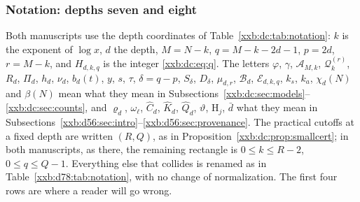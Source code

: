 \documentclass[11pt,a4paper]{article}
\numberwithin{equation}{section}
\theoremstyle{definition}
\theoremstyle{remark}
\theoremstyle{plain}
\begin{document}
\subsubsection{Notation: depths seven and eight}\label{xxb:d78:sec:notation}

Both manuscripts use the depth coordinates of
Table~\ref{xxb:dc:tab:notation}: $k$ is the exponent of $\log x$, $d$ the
depth, $M=N-k$, $q=M-k-2d-1$, $p=2d$, $r=M-k$, and $H_{d,k,q}$ is the integer
\eqref{xxb:dc:eq:q}.  The letters $\varphi$, $\gamma$, $\mathcal A_{M,k}$,
$\mathcal Q_k^{(r)}$, $R_d$, $\Pi_d$, $h_d$, $\nu_d$, $b_d(t)$, $y$, $s$,
$\tau$, $\delta=q-p$, $S_\delta$, $D_\delta$, $\mu_{d,r}$, $\mathcal B_d$,
$\mathcal E_{d,k,q}$, $k_s$, $k_a$, $\chi_d(N)$ and $\beta(N)$ mean what they
mean in Subsections~\ref{xxb:dc:sec:models}--\ref{xxb:dc:sec:counts}, and
$\varrho_d$, $\omega_\ell$, $\widehat C_d$, $\widehat K_d$, $\widehat Q_d$,
$\vartheta$, $\mathrm H_j$, $\bar d$ what they mean in
Subsections~\ref{xxb:d56:sec:intro}--\ref{xxb:d56:sec:provenance}.  The
practical cutoffs at a fixed depth are written $(R,Q)$, as in
Proposition~\ref{xxb:dc:prop:smallcert}; in both manuscripts, as there, the
remaining rectangle is $0\le k\le R-2$, $0\le q\le Q-1$.  Everything else that
collides is renamed as in Table~\ref{xxb:d78:tab:notation}, with no change of
normalization.  The first four rows are where a reader will go wrong.
\end{document}
